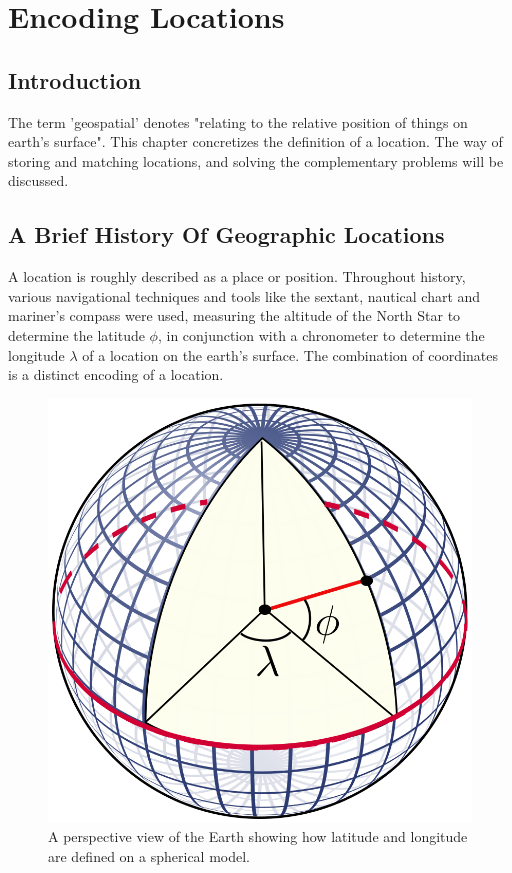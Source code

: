 \graphicspath{{Chapter2/Figs/Vector/}{Chapter2/Figs/}}

%
\chapter{Encoding Locations}
\section{Introduction}
The term 'geospatial' denotes "relating to the relative position of things on earth's surface". This chapter concretizes the definition of a location. The way of storing and matching locations, and solving the complementary problems will be discussed.

%
\section{A Brief History Of Geographic Locations}
A location is roughly described as a place or position. Throughout history, various navigational techniques and tools like the sextant, nautical chart and mariner's compass were used, measuring the altitude of the North Star to determine the latitude $\phi$, in conjunction with a chronometer to determine the longitude $\lambda$ of a location on the earth's surface. The combination of coordinates is a distinct encoding of a location.

\begin{figure}[htbp!]
	\centering
	\includegraphics[width=.2\textwidth]{LatLngSphere}
	\caption[Latitude Longitude on a Sphere]{A perspective view of the Earth showing how latitude and longitude are defined on a spherical model.}
	\label{fig:latlngsphere}
\end{figure}

